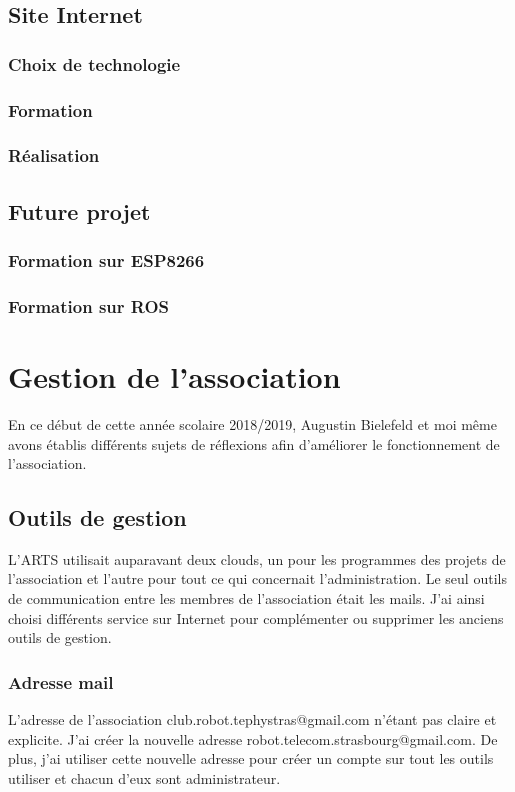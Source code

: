 \documentclass[12pt,a4paper]{report}
\begin{document}
  \section{Site Internet}
    \subsection{Choix de technologie}
    \subsection{Formation}
    \subsection{Réalisation}
  \section{Future projet}
    \subsection{Formation sur ESP8266}
    \subsection{Formation sur ROS}

\chapter{Gestion de l'association}
  En ce début de cette année scolaire 2018/2019, Augustin Bielefeld et moi même avons établis différents sujets de réflexions afin d'améliorer le fonctionnement de l'association.

  \section{Outils de gestion}
    L'ARTS utilisait auparavant deux clouds, un pour les programmes des projets de l'association et l'autre pour tout ce qui concernait l'administration.
    Le seul outils de communication entre les membres de l'association était les mails.
    J'ai ainsi choisi différents service sur Internet pour complémenter ou supprimer les anciens outils de gestion.

    \subsection{Adresse mail}
      L'adresse de l'association club.robot.tephystras@gmail.com n'étant pas claire et explicite. J'ai créer la nouvelle adresse robot.telecom.strasbourg@gmail.com.
      De plus, j'ai utiliser cette nouvelle adresse pour créer un compte sur tout les outils utiliser et chacun d'eux sont administrateur.
\end{document}
